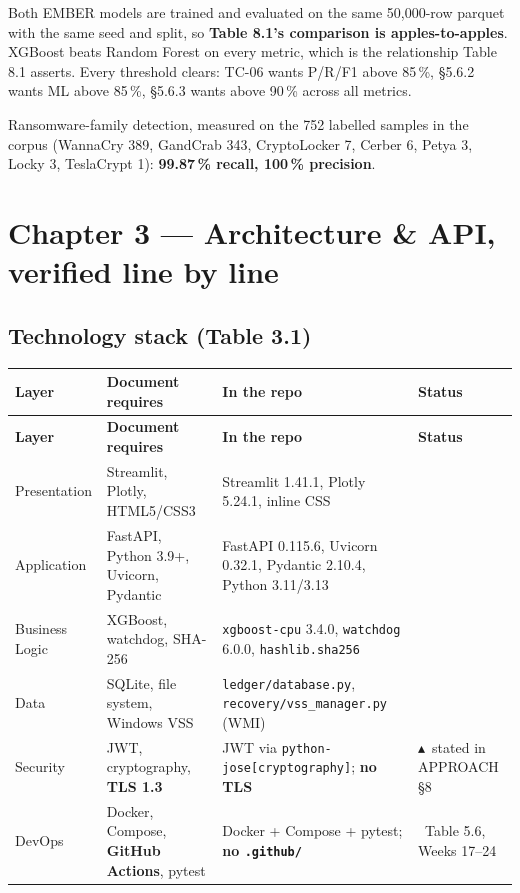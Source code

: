 \documentclass[11pt,a4paper]{article}
\newcommand{\ok}{\textcolor{okgreen}{\ding{51}}}
\newcommand{\warn}{\textcolor{warnamber}{$\blacktriangle$}}
\newcommand{\defer}{\textcolor{deferblue}{\textbf{\textbardbl}}}
\begin{document}
Both EMBER models are trained and evaluated on the same 50,000-row parquet with
the same seed and split, so \textbf{Table 8.1's comparison is apples-to-apples}.
XGBoost beats Random Forest on every metric, which is the relationship Table 8.1
asserts. Every threshold clears: TC-06 wants P/R/F1 above 85\,\%, \S5.6.2 wants ML
above 85\,\%, \S5.6.3 wants above 90\,\% across all metrics.

Ransomware-family detection, measured on the 752 labelled samples in the corpus
(WannaCry 389, GandCrab 343, CryptoLocker 7, Cerber 6, Petya 3, Locky 3,
TeslaCrypt 1): \textbf{99.87\,\% recall, 100\,\% precision}.

\section{Chapter 3 --- Architecture \& API, verified line by line}

\subsection{Technology stack (Table 3.1)}

\begin{xltabular}{\linewidth}{@{}P{2.2cm}Y{1.00}Y{1.10}Y{0.90}@{}}
\toprule
\textbf{Layer} & \textbf{Document requires} & \textbf{In the repo} & \textbf{Status} \\
\midrule
\endfirsthead
\toprule
\textbf{Layer} & \textbf{Document requires} & \textbf{In the repo} & \textbf{Status} \\
\midrule
\endhead
\bottomrule
\endfoot

Presentation    & Streamlit, Plotly, HTML5/CSS3
                & Streamlit 1.41.1, Plotly 5.24.1, inline CSS & \ok \\
Application     & FastAPI, Python 3.9+, Uvicorn, Pydantic
                & FastAPI 0.115.6, Uvicorn 0.32.1, Pydantic 2.10.4, Python 3.11/3.13 & \ok \\
Business Logic  & XGBoost, watchdog, SHA-256
                & \texttt{xgboost-cpu} 3.4.0, \texttt{watchdog} 6.0.0, \texttt{hashlib.sha256} & \ok \\
Data            & SQLite, file system, Windows VSS
                & \texttt{ledger/database.py}, \texttt{recovery/vss\_manager.py} (WMI) & \ok \\
Security        & JWT, cryptography, \textbf{TLS 1.3}
                & JWT via \texttt{python-jose[cryptography]}; \textbf{no TLS}
                & \warn\ stated in APPROACH \S8 \\
DevOps          & Docker, Compose, \textbf{GitHub Actions}, pytest
                & Docker + Compose + pytest; \textbf{no \texttt{.github/}}
                & \defer\ Table 5.6, Weeks 17--24 \\
\end{xltabular}
\end{document}
